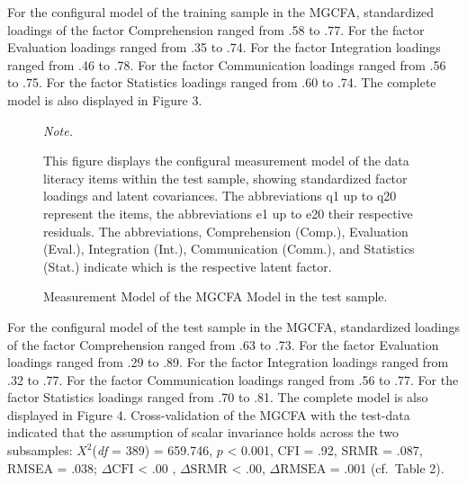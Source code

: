 \documentclass[
  12pt,
  a4paper,
  twoside]{article}
\begin{document}
For the configural model of the training sample in the MGCFA, standardized loadings of the factor Comprehension ranged from .58 to .77. For the factor Evaluation loadings ranged from .35 to .74. For the factor Integration loadings ranged from .46 to .78. For the factor Communication loadings ranged from .56 to .75. For the factor Statistics loadings ranged from .60 to .74. The complete model is also displayed in Figure 3.

\vspace{0.3cm}
\begin{figure}
    \centering
    \caption{Measurement Model of the MGCFA Model in the test sample.} 
    \small
    \textit{Note.} \raggedright This figure displays the configural measurement model of the data literacy items within the test sample, showing standardized factor loadings and latent covariances. The abbreviations q1 up to q20 represent the items, the abbreviations e1 up to e20 their respective residuals. The abbreviations, Comprehension (Comp.), Evaluation (Eval.), Integration (Int.), Communication (Comm.), and Statistics (Stat.) indicate which is the respective latent factor.
\end{figure}
\vspace{0.3cm}

For the configural model of the test sample in the MGCFA, standardized loadings of the factor Comprehension ranged from .63 to .73. For the factor Evaluation loadings ranged from .29 to .89. For the factor Integration loadings ranged from .32 to .77. For the factor Communication loadings ranged from .56 to .77. For the factor Statistics loadings ranged from .70 to .81. The complete model is also displayed in Figure 4.
Cross-validation of the MGCFA with the test-data indicated that the assumption of scalar invariance holds across the two subsamples: \(X^{2}\)(\emph{df} = 389) = 659.746, \(p\) \textless{} 0.001, CFI = .92, SRMR = .087, RMSEA = .038; \(\Delta\text{CFI}\) \textless{} .00 , \(\Delta\text{SRMR}\) \textless{} .00, \(\Delta\text{RMSEA}\) = .001 (cf.~Table 2).
\end{document}
